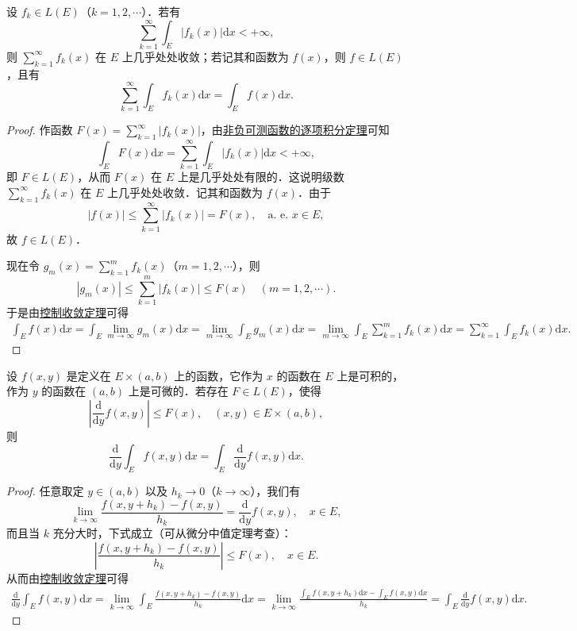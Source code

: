 \documentclass[../../main.tex]{subfiles}
\begin{document}
\begin{corollary}[逐项积分定理]\label{corollary:逐项积分定理}
设 \( f_k \in L(E) \)（\( k = 1,2,\cdots \)）．若有
\[
\sum_{k=1}^{\infty} \int_E |f_k(x)| \mathrm{d}x < +\infty,
\]
则 \( \sum_{k=1}^{\infty} f_k(x) \) 在 \( E \) 上几乎处处收敛；若记其和函数为 \( f(x) \)，则 \( f \in L(E) \)，且有
\[
\sum_{k=1}^{\infty} \int_E f_k(x) \mathrm{d}x = \int_E f(x) \mathrm{d}x. 
\]
\end{corollary}
\begin{proof}
作函数 \( F(x) = \sum_{k=1}^{\infty} |f_k(x)| \)，由\hyperref[theorem:非负可测函数的逐项积分定理]{非负可测函数的逐项积分定理}可知
\[
\int_E F(x) \mathrm{d}x = \sum_{k=1}^{\infty} \int_E |f_k(x)| \mathrm{d}x < +\infty,
\]
即 \( F \in L(E) \)，从而 \( F(x) \) 在 \( E \) 上是几乎处处有限的．这说明级数 \( \sum_{k=1}^{\infty} f_k(x) \) 在 \( E \) 上几乎处处收敛．记其和函数为 \( f(x) \)．由于
\[
|f(x)| \leqslant \sum_{k=1}^{\infty} |f_k(x)| = F(x), \quad \text{a. e. } x \in E,
\]
故 \( f \in L(E) \)．

现在令 \( g_m(x) = \sum_{k=1}^{m} f_k(x) \)（\( m = 1,2,\cdots \)），则
\[
|g_m(x)| \leqslant \sum_{k=1}^{m} |f_k(x)| \leqslant F(x) \quad (m = 1,2,\cdots).
\]
于是由\hyperref[theorem:控制收敛定理]{控制收敛定理}可得
\begin{align*}
\int_E{f(x)\mathrm{d}x}=\int_E{\lim_{m\rightarrow \infty} g_m(x)\mathrm{d}x}=\lim_{m\rightarrow \infty} \int_E{g_m(x)\mathrm{d}x}=\underset{m\rightarrow \infty}{\lim}\int_E{\sum_{k=1}^m{f_k\left( x \right)}\mathrm{d}x}=\sum_{k=1}^{\infty}{\int_E{f_k(x)\mathrm{d}x}}.
\end{align*}
\end{proof}

\begin{theorem}[积分号下求导]\label{theorem:积分号下求导}
设 \( f(x,y) \) 是定义在 \( E \times (a,b) \) 上的函数，它作为 \( x \) 的函数在 \( E \) 上是可积的，作为 \( y \) 的函数在 \( (a,b) \) 上是可微的．若存在 \( F \in L(E) \)，使得
\[
\left| \frac{\mathrm{d}}{\mathrm{d}y} f(x,y) \right| \leqslant F(x), \quad (x,y) \in E \times (a,b),
\]
则
\[
\frac{\mathrm{d}}{\mathrm{d}y} \int_E f(x,y) \mathrm{d}x = \int_E \frac{\mathrm{d}}{\mathrm{d}y} f(x,y) \mathrm{d}x. 
\]
\end{theorem}
\begin{proof}
任意取定 \( y \in (a,b) \) 以及 \( h_k \to 0 \)（\( k \to \infty \)），我们有
\[
\lim_{k \to \infty} \frac{f(x,y + h_k) - f(x,y)}{h_k} = \frac{\mathrm{d}}{\mathrm{d}y} f(x,y), \quad x \in E,
\]
而且当 \( k \) 充分大时，下式成立（可从微分中值定理考查）：
\[
\left| \frac{f(x,y + h_k) - f(x,y)}{h_k} \right| \leqslant F(x), \quad x \in E.
\]
从而由\hyperref[theorem:控制收敛定理]{控制收敛定理}可得
\begin{align*}
\frac{\mathrm{d}}{\mathrm{d}y}\int_E{f(x,y)\mathrm{d}x}=\lim_{k\rightarrow \infty} \int_E{\frac{f(x,y+h_k)-f(x,y)}{h_k}\mathrm{d}x}=\lim_{k\rightarrow \infty} \frac{\int_E{f\left( x,y+h_k \right) \mathrm{d}x}-\int_E{f\left( x,y \right) \mathrm{d}x}}{h_k}=\int_E{\frac{\mathrm{d}}{\mathrm{d}y}f(x,y)\mathrm{d}x}.
\end{align*}
\end{proof}
\end{document}
